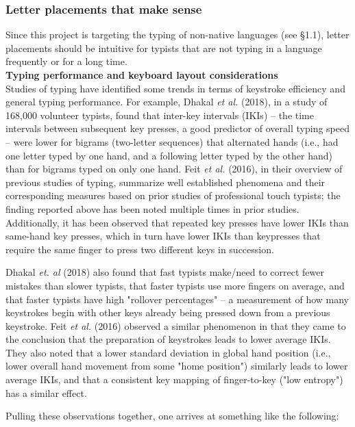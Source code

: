 \documentclass[11pt]{article}
\begin{document}
\subsubsection{Letter placements that make sense}
\label{sec:orgdd51dd3}

Since this project is targeting the typing of non-native languages (see §1.1), letter placements should be intuitive for typists that are not typing in a language frequently or for a long time. \\

\noindent \textbf{Typing performance and keyboard layout considerations} \\

Studies of typing have identified some trends in terms of keystroke efficiency and general typing performance. For example, Dhakal \emph{et al.} (2018), in a study of 168,000 volunteer typists, found that inter-key intervals (IKIs) -- the time intervals between subsequent key presses, a good predictor of overall typing speed -- were lower for bigrams (two-letter sequences) that alternated hands (i.e., had one letter typed by one hand, and a following letter typed by the other hand) than for bigrams typed on only one hand. Feit \emph{et al.} (2016), in their overview of previous studies of typing, summarize well established phenomena and their corresponding measures based on prior studies of professional touch typists; the finding reported above has been noted multiple times in prior studies. Additionally, it has been observed that repeated key presses have lower IKIs than same-hand key presses, which in turn have lower IKIs than keypresses that require the same finger to press two different keys in succession.

Dhakal \emph{et. al} (2018) also found that fast typists make/need to correct fewer mistakes than slower typists, that faster typists use more fingers on average, and that faster typists have high "rollover percentages" -- a measurement of how many keystrokes begin with other keys already being pressed down from a previous keystroke. Feit \emph{et al.} (2016) observed a similar phenomenon in that they came to the conclusion that the preparation of keystrokes leads to lower average IKIs. They also noted that a lower standard deviation in global hand position (i.e., lower overall hand movement from some "home position") similarly leads to lower average IKIs, and that a consistent key mapping of finger-to-key ("low entropy") has a similar effect.

Pulling these observations together, one arrives at something like the following:
\end{document}
